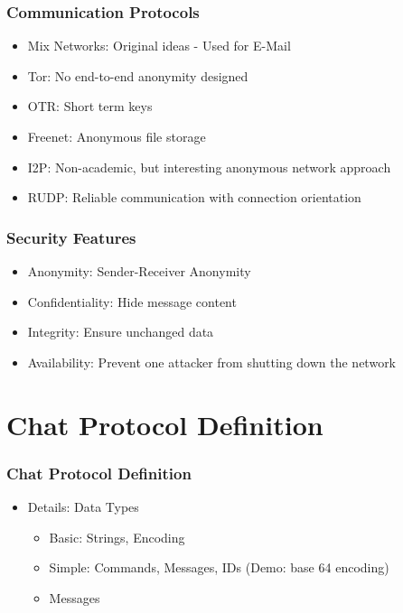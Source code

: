 \documentclass{beamer}
\begin{document}
\frame
{
  \frametitle{Communication Protocols}
      \begin{itemize}
          \item Mix Networks: Original ideas - Used for E-Mail
          \item Tor: No end-to-end anonymity designed
          \item OTR: Short term keys
          \item Freenet: Anonymous file storage
          \item I2P: Non-academic, but interesting anonymous network approach
          \item RUDP: Reliable communication with connection orientation
      \end{itemize}
}

\frame
{
  \frametitle{Security Features}
  \begin{itemize}
          \item Anonymity: Sender-Receiver Anonymity
          \item Confidentiality: Hide message content
          \item Integrity: Ensure unchanged data
          \item Availability: Prevent one attacker from shutting down the network
   \end{itemize}
}

\section{Chat Protocol Definition}
\frame
{
  \frametitle{Chat Protocol Definition}
  \begin{itemize}
      \item Details: Data Types 
      \begin{itemize}
          \item Basic: Strings, Encoding
          \item Simple: Commands, Messages, IDs \pause (Demo: base 64 encoding)
          \pause \item Messages
      \end{itemize}
   \end{itemize}
}
\end{document}
